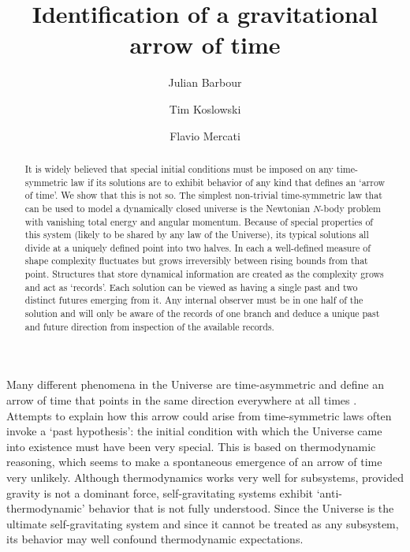 \documentclass[prl,nofootinbib,twocolumn,superscriptaddress]{revtex4}
\begin{document}
\title{Identification of a gravitational arrow of time}


\author{Julian Barbour}

\author{Tim Koslowski}

\author{Flavio Mercati}




\begin{abstract}
It is widely believed that special initial conditions must be imposed on any time-symmetric law if its solutions are to exhibit behavior of any kind that defines an `arrow of time'. We show that this is not so. The simplest non-trivial time-symmetric law that can be used to model a dynamically closed universe is the Newtonian $N$-body problem with vanishing total energy and angular momentum. Because of special properties of this system (likely to be shared by any law of the Universe), its typical solutions all divide at a uniquely defined point into two halves. In each a well-defined measure of shape complexity fluctuates but grows irreversibly between rising bounds from that point. Structures that store dynamical information are created as the complexity grows and act as `records'. Each solution can be viewed as having a single past and two distinct futures emerging from it. Any internal observer must be in one half of the solution and will only be aware of the records of one branch and deduce a unique past and future direction from inspection of the available records.
\end{abstract}

\maketitle


Many different phenomena in the Universe are time-asymmetric and define an arrow of time that points in the same direction everywhere at all times \cite{zeh2007physical}. Attempts to explain how this arrow could arise from time-symmetric laws often invoke a `past hypothesis': the initial condition with which the Universe came into existence must have been very special. 
This is based on thermodynamic reasoning, which seems to make a spontaneous emergence of an arrow of time very unlikely. Although thermodynamics works very well for subsystems,
provided gravity is not a dominant force, self-gravitating systems exhibit
`anti-thermodynamic' behavior that is not fully understood. Since the
Universe is the ultimate self-gravitating system and since it cannot be
treated as any subsystem, its behavior may well confound
thermodynamic expectations.
\end{document}
